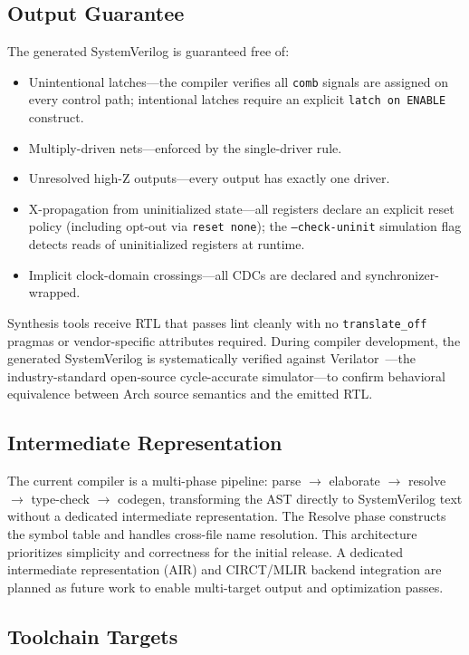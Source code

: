 \documentclass[manuscript]{acmart}
\begin{document}
\subsection{Output Guarantee}

The generated SystemVerilog is guaranteed free of:
\begin{itemize}
\item Unintentional latches---the compiler verifies all \texttt{comb} signals are assigned on every control path; intentional latches require an explicit \texttt{latch on ENABLE} construct.
\item Multiply-driven nets---enforced by the single-driver rule.
\item Unresolved high-Z outputs---every output has exactly one driver.
\item X-propagation from uninitialized state---all registers declare an explicit reset policy (including opt-out via \texttt{reset none}); the \texttt{--check-uninit} simulation flag detects reads of uninitialized registers at runtime.
\item Implicit clock-domain crossings---all CDCs are declared and synchronizer-wrapped.
\end{itemize}

Synthesis tools receive RTL that passes lint cleanly with no \texttt{translate\_off} pragmas or vendor-specific attributes required. During compiler development, the generated SystemVerilog is systematically verified against Verilator~\cite{verilator}---the industry-standard open-source cycle-accurate simulator---to confirm behavioral equivalence between Arch source semantics and the emitted RTL.

\subsection{Intermediate Representation}

The current compiler is a multi-phase pipeline: parse $\to$ elaborate $\to$ resolve $\to$ type-check $\to$ codegen, transforming the AST directly to SystemVerilog text without a dedicated intermediate representation. The Resolve phase constructs the symbol table and handles cross-file name resolution. This architecture prioritizes simplicity and correctness for the initial release. A dedicated intermediate representation (AIR) and CIRCT/MLIR backend integration are planned as future work to enable multi-target output and optimization passes.

\subsection{Toolchain Targets}
\end{document}

